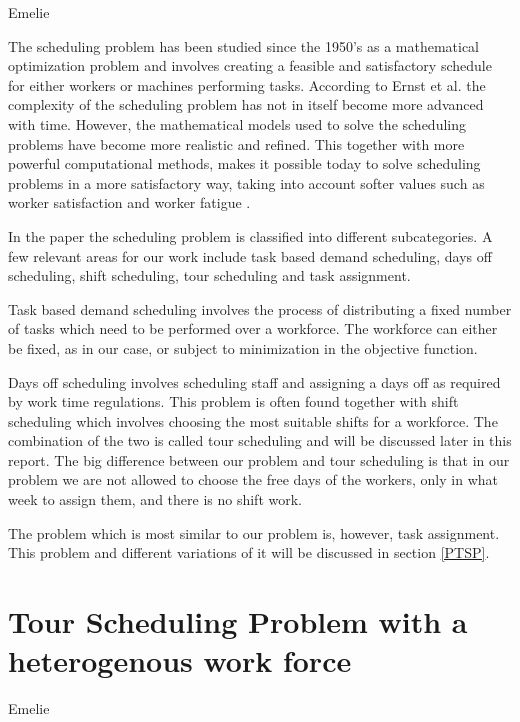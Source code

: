Emelie

The scheduling problem has been studied since the 1950's as a mathematical optimization problem and involves creating a feasible and satisfactory schedule for either workers or machines performing tasks. According to Ernst et al. the complexity of the scheduling problem has not in itself become more advanced with time. However, the mathematical models used to solve the scheduling problems have become more realistic and refined. This together with more powerful computational methods, makes it possible today to solve scheduling problems in a more satisfactory way, taking into account softer values such as worker satisfaction and worker fatigue \cite{Ernst_2004}.

In the paper \cite{Ernst_2004} the scheduling problem is classified into different subcategories. A few relevant areas for our work include task based demand scheduling, days off scheduling, shift scheduling, tour scheduling and task assignment. 

Task based demand scheduling involves the process of distributing a fixed number of tasks which need to be performed over a workforce. The workforce can either be fixed, as in our case, or subject to minimization in the objective function.
	
Days off scheduling involves scheduling staff and assigning a days off as required by work time regulations. This problem is often found together with shift scheduling which involves choosing the most suitable shifts for a workforce. The combination of the two is called tour scheduling and will be discussed later in this report. The big difference between our problem and tour scheduling is that in our problem we are not allowed to choose the free days of the workers, only in what week to assign them, and there is no shift work.

The problem which is most similar to our problem is, however, task assignment. This problem and different variations of it will be discussed in section \ref{PTSP}.



\section{Tour Scheduling Problem with a heterogenous work force}\label{TSP}
Emelie

